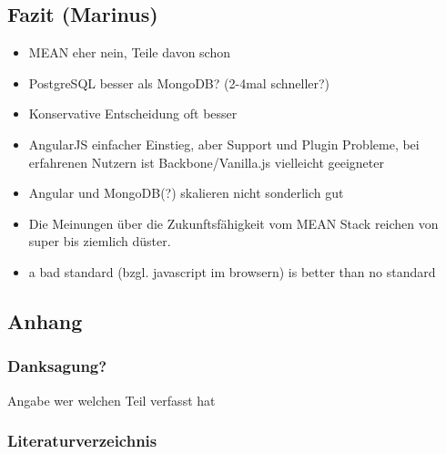 \documentclass[]{article}
\begin{document}
\subsection{Fazit (Marinus)}\label{fazit-marinus}

\begin{itemize}
\itemsep1pt\parskip0pt
\item
  MEAN eher nein, Teile davon schon
\item
  PostgreSQL besser als MongoDB? (2-4mal schneller?)
\item
  Konservative Entscheidung oft besser
\item
  AngularJS einfacher Einstieg, aber Support und Plugin Probleme, bei
  erfahrenen Nutzern ist Backbone/Vanilla.js vielleicht geeigneter
\item
  Angular und MongoDB(?) skalieren nicht sonderlich gut
\item
  Die Meinungen über die Zukunftsfähigkeit vom MEAN Stack reichen von
  super bis ziemlich düster.
\item
  a bad standard (bzgl. javascript im browsern) is better than no
  standard
\end{itemize}

\subsection{Anhang}\label{anhang}

\subsubsection{Danksagung?}\label{danksagung}

Angabe wer welchen Teil verfasst hat

\subsubsection{Literaturverzeichnis}\label{literaturverzeichnis}
\end{document}

